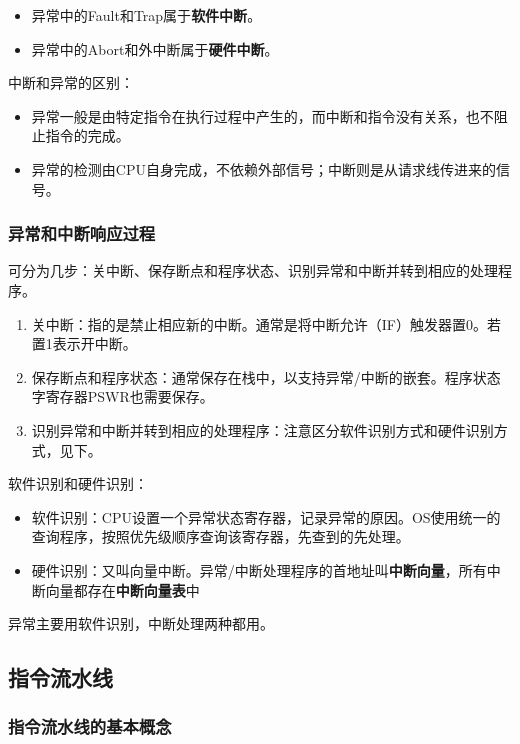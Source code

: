 \documentclass[12pt, a4paper, oneside]{ctexart}
\begin{document}
\begin{itemize}
  \item 异常中的Fault和Trap属于\textbf{软件中断}。
  \item 异常中的Abort和外中断属于\textbf{硬件中断}。
\end{itemize}

中断和异常的区别：
\begin{itemize}
  \item 异常一般是由特定指令在执行过程中产生的，而中断和指令没有关系，也不阻止指令的完成。
  \item 异常的检测由CPU自身完成，不依赖外部信号；中断则是从请求线传进来的信号。
\end{itemize}

\subsubsection{异常和中断响应过程}

可分为几步：关中断、保存断点和程序状态、识别异常和中断并转到相应的处理程序。

\begin{enumerate}
  \item 关中断：指的是禁止相应新的中断。通常是将中断允许（IF）触发器置0。若置1表示开中断。
  \item 保存断点和程序状态：通常保存在栈中，以支持异常/中断的嵌套。程序状态字寄存器PSWR也需要保存。
  \item 识别异常和中断并转到相应的处理程序：注意区分软件识别方式和硬件识别方式，见下。
\end{enumerate}

软件识别和硬件识别：
\begin{itemize}
  \item 软件识别：CPU设置一个异常状态寄存器，记录异常的原因。OS使用统一的查询程序，按照优先级顺序查询该寄存器，先查到的先处理。
  \item 硬件识别：又叫向量中断。异常/中断处理程序的首地址叫\textbf{中断向量}，所有中断向量都存在\textbf{中断向量表}中
\end{itemize}
异常主要用软件识别，中断处理两种都用。

\subsection{指令流水线}

\subsubsection{指令流水线的基本概念}
\end{document}
